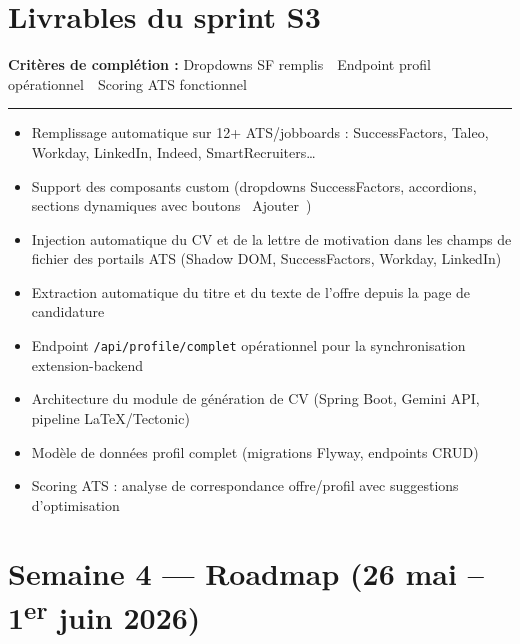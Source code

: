 \documentclass[11pt,a4paper]{article}
\begin{document}
\section{Livrables du sprint S3}

\begin{tcolorbox}[
  colback=livbg, colframe=livgreen,
  arc=3pt, left=8pt, right=8pt, top=6pt, bottom=6pt
]
\textcolor{livgreen}{\textbf{Crit\`eres de compl\'etion :} Dropdowns SF remplis~\textbullet~Endpoint profil op\'erationnel~\textbullet~Scoring ATS fonctionnel}
\vspace{4pt}
{\color{livgreen!50!black}\rule{\linewidth}{0.5pt}}
\vspace{4pt}
\begin{itemize}[leftmargin=1.2em, itemsep=2pt, topsep=0pt, parsep=0pt]
  \item Remplissage automatique sur 12+ ATS/jobboards : SuccessFactors, Taleo, Workday, LinkedIn, Indeed, SmartRecruiters\ldots
  \item Support des composants custom (dropdowns SuccessFactors, accordions, sections dynamiques avec boutons \guillemotleft~Ajouter~\guillemotright)
  \item Injection automatique du CV et de la lettre de motivation dans les champs de fichier des portails ATS (Shadow DOM, SuccessFactors, Workday, LinkedIn)
  \item Extraction automatique du titre et du texte de l'offre depuis la page de candidature
  \item Endpoint \texttt{/api/profile/complet} op\'erationnel pour la synchronisation extension-backend
  \item Architecture du module de g\'en\'eration de CV (Spring Boot, Gemini API, pipeline LaTeX/Tectonic)
  \item Mod\`ele de donn\'ees profil complet (migrations Flyway, endpoints CRUD)
  \item Scoring ATS : analyse de correspondance offre/profil avec suggestions d'optimisation
\end{itemize}
\end{tcolorbox}

\clearpage


\section{Semaine 4 --- Roadmap (26 mai -- 1\textsuperscript{er} juin 2026)}
\end{document}
